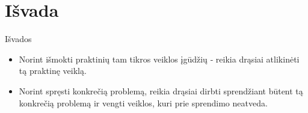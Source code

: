 \section{Išvada}

 \begin{frame}[c]{Išvados}
    \begin{minipage}{0.48\textwidth}
        \begin{itemize}
            \item Norint išmokti praktinių tam tikros veiklos įgūdžių ‐ reikia drąsiai atlikinėti tą praktinę veiklą.
        \end{itemize}
    \end{minipage}
    \begin{minipage}{0.48\textwidth}
        \begin{itemize}
            \item Norint spręsti konkrečią problemą, reikia drąsiai dirbti sprendžiant būtent tą konkrečią problemą ir vengti veiklos, kuri prie sprendimo neatveda.
        \end{itemize}
    \end{minipage}
\end{frame}
